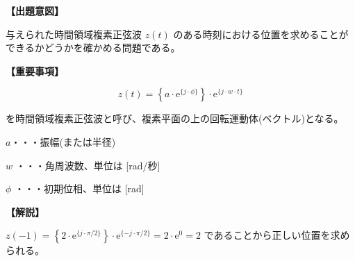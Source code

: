 \noindent \textbf{【出題意図】}

\bigskip
\noindent 与えられた時間領域複素正弦波 $z(t)$ のある時刻における位置を求めることができるかどうかを確かめる問題である。

\vspace{1em}
\noindent \textbf{【重要事項】}

\[
z(t) =  \left \{ a \cdot \textrm{e}^{\{j \cdot \phi\}} \right \} 
\cdot \textrm{e}^{\{j \cdot w \cdot t \}}
\]

\bigskip
\noindent を時間領域複素正弦波と呼び、複素平面の上の回転運動体(ベクトル)となる。

\bigskip
\noindent\quad  $a$・・・振幅(または半径)

\bigskip
\noindent\quad $w$ ・・・角周波数、単位は [rad/秒]

\bigskip
\noindent\quad $\phi$ ・・・初期位相、単位は [rad]

\bigskip

\vspace{1em}
\noindent \textbf{【解説】}

\bigskip
\noindent 
$
z(-1) =  \left \{ 2 \cdot \textrm{e}^{\{j \cdot \pi/2 \}} \right \} \cdot \textrm{e}^{\{ -j \cdot \pi/2 \}}
= 2 \cdot \textrm{e}^{0} = 2$ であることから正しい位置を求められる。

